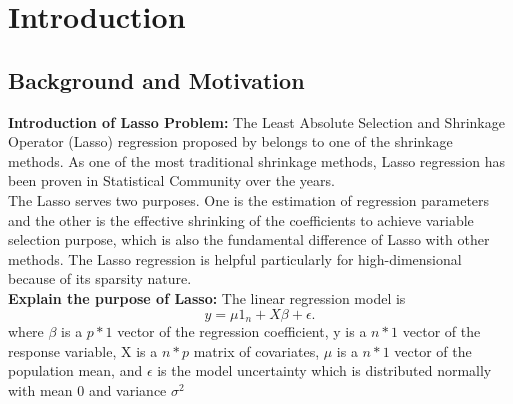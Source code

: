 \chapter{Introduction}
\label{Chapter1}
\section{Background and Motivation}




\textbf{Introduction of Lasso Problem: }
The Least Absolute Selection and Shrinkage Operator (Lasso) regression proposed by \cite{tibshirani_1996} belongs to one of the shrinkage methods. As one of the most traditional shrinkage methods, Lasso regression has been proven in Statistical Community over the years.\\
The Lasso serves two purposes. One is the estimation of regression parameters and the other is the effective shrinking of the coefficients to achieve variable selection purpose, which is also the fundamental difference of Lasso with other methods. The Lasso regression is helpful particularly for high-dimensional because of its sparsity nature.\\
\textbf{Explain the purpose of Lasso:}
The linear regression model is
\begin{equation}
	\label{eq:LRmodel}
	y = \mu 1_n + X\beta + \epsilon.
\end{equation} 
where $\beta$ is a $p*1$ vector of the regression coefficient, y is a $n*1$ vector of the response variable, X is a $n*p$ matrix of covariates, $\mu$ is a $n*1$ vector of the population mean, and $\epsilon$ is the model uncertainty which is distributed normally with mean 0 and variance $\sigma^2$

